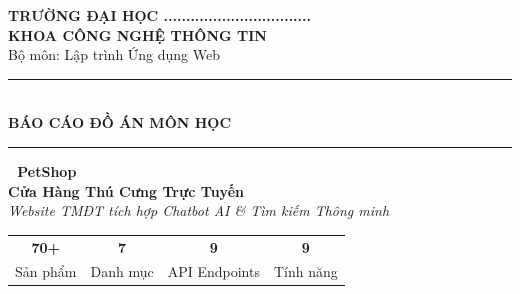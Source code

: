\documentclass[12pt, a4paper]{report}
\begin{document}
\begin{titlepage}
    \centering
    \vspace*{1cm}

    {\large\textbf{TRƯỜNG ĐẠI HỌC .................................}}\\[0.3cm]
    {\large\textbf{KHOA CÔNG NGHỆ THÔNG TIN}}\\[0.2cm]
    {\normalsize Bộ môn: Lập trình Ứng dụng Web}

    \vspace{1.5cm}
    \rule{\textwidth}{2pt}\\[0.5cm]

    {\Huge\bfseries\textcolor{primaryColor}{BÁO CÁO ĐỒ ÁN MÔN HỌC}}\\[0.5cm]
    \rule{\textwidth}{2pt}

    \vspace{1cm}

    {\huge\bfseries 🐾 PetShop}\\[0.3cm]
    {\LARGE\bfseries Cửa Hàng Thú Cưng Trực Tuyến}\\[0.5cm]
    {\large\textit{Website TMĐT tích hợp Chatbot AI \& Tìm kiếm Thông minh}}

    \vspace{1cm}

    \begin{tcolorbox}[colback=primaryColor!5, colframe=primaryColor, width=0.8\textwidth]
        \centering
        \begin{tabular}{cccc}
            \Large\textbf{\textcolor{primaryColor}{70+}} &
            \Large\textbf{\textcolor{primaryColor}{7}} &
            \Large\textbf{\textcolor{primaryColor}{9}} &
            \Large\textbf{\textcolor{primaryColor}{9}} \\
            \small Sản phẩm &
            \small Danh mục &
            \small API Endpoints &
            \small Tính năng \\
        \end{tabular}
    \end{tcolorbox}

    \vspace{1.5cm}


\end{titlepage}
\end{document}
